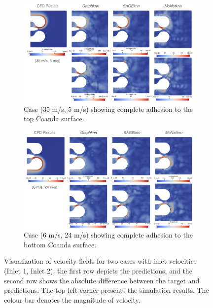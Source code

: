 \begin{figure}[ht]
    \centering
    \begin{subfigure}[b]{14cm}
        \centering
        \includegraphics[width=\textwidth]{images/Methodology/Asset 15.png}
        \caption{Case (35 m/s, 5 m/s) showing complete adhesion to the top Coanda surface.}
        \label{fig:allvel3}
    \end{subfigure}
    \begin{subfigure}[b]{14cm}
        \centering
        \includegraphics[width=\textwidth]{images/Methodology/Asset 14.png}
        \caption{Case (6 m/s, 24 m/s) showing complete adhesion to the bottom Coanda surface.}
        \label{fig:allvel4}
    \end{subfigure}
    \caption{Visualization of velocity fields for two cases with inlet velocities (Inlet 1, Inlet 2): the first row depicts the predictions, and the second row shows the absolute difference between the target and predictions. The top left corner presents the simulation results. The colour bar denotes the magnitude of velocity. }
    \label{2vel2}
\end{figure}
